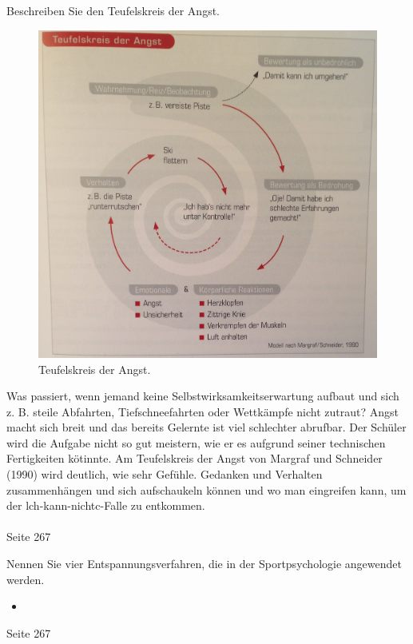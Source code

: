 \begin{question}{6}
Beschreiben Sie den Teufelskreis der Angst.
\end{question}
\begin{solution}
\begin{figure}[H]
  \centering
  \includegraphics[width=12cm]{pic/angst.jpg}
  \caption{Teufelskreis der Angst.}
  \label{fig:angst}
\end{figure}
Was passiert, wenn jemand keine Selbstwirksamkeitserwartung aufbaut und sich z. B. steile Abfahrten, Tiefschneefahrten oder Wettkämpfe nicht zutraut? Angst macht sich breit und das bereits Gelernte ist viel schlechter abrufbar. Der Schüler wird die Aufgabe nicht so gut meistern, wie er es aufgrund seiner technischen Fertigkeiten kötinnte. Am Teufelskreis der Angst von Margraf und Schneider (1990) wird deutlich, wie sehr Gefühle. Gedanken und Verhalten zusammenhängen und sich aufschaukeln können und wo man eingreifen kann, um der lch-kann-nichtc-Falle zu entkommen.\\\\
 Seite 267
\end{solution}

\begin{question}{2}
Nennen Sie vier Entspannungsverfahren, die in der Sportpsychologie angewendet werden.
\end{question}
\begin{solution}
\begin{itemize}
\item 
\end{itemize}
 Seite 267
\end{solution}